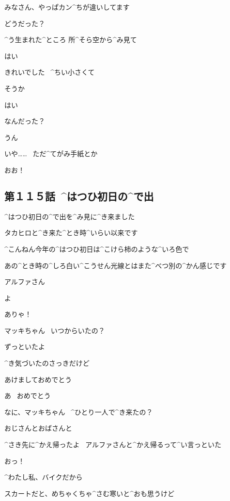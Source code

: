 \Alpha みなさん、やっぱカン^{ちが}{違}いしてます

\page[58]
\Nai どうだった？

\Nai ^{う}{生}まれた^{ところ }{所}^{そら}{空}から^{み}{見}て

\Takahiro はい

\Takahiro きれいでした
\ ^{ちい}{小}さくて

\Nai そうか

\Takahiro はい

\page[59]
\Alpha なんだった？

\Makki うん

\page[60]
\Makki いや……
\ ただ^{てがみ}{手紙}とか

\Alpha おお！


\subsection{第１１５話\ ^{はつひ}{初日}の^{で}{出}}

\page[64]
\Alpha ^{はつひ}{初日}の^{で}{出}を^{み}{見}に^{き}{来}ました

\page[66]
\Alpha タカヒロと^{き}{来}た^{とき}{時}^{いらい}{以来}です

\Alpha ^{こんねん}{今年}の^{はつひ}{初日}は^{こけら}{柿}のような^{いろ}{色}で

\Alpha あの^{とき}{時}の^{しろ}{白}い^{こうせん}{光線}とはまた^{べつ}{別}の^{かん}{感}じです

\page[67]
\Makki アルファさん

\page[68]
\Makki よ

\Alpha ありゃ！

\Alpha マッキちゃん
\ いつからいたの？

\Makki ずっといたよ

\Makki ^{き}{気}づいたのさっきだけど

\page[69]
\Makki あけましておめでとう

\Alpha あ
\ おめでとう

\Alpha なに、マッキちゃん
\ ^{ひとり}{一人}で^{き}{来}たの？

\Makki おじさんとおばさんと

\Makki ^{さき}{先}に^{かえ}{帰}ったよ
\ アルファさんと^{かえ}{帰}るって^{い}{言}っといた

\Alpha おっ！

\page[70]
\Alpha ^{わたし}{私}、バイクだから

\Alpha スカートだと、めちゃくちゃ^{さむ}{寒}いと^{おも}{思}うけど

